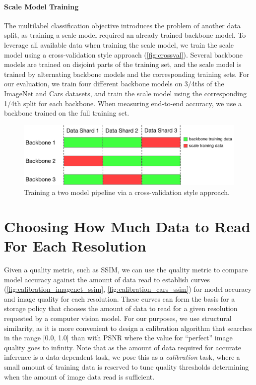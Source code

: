 \paragraph{Scale Model Training}
The multilabel classification objective introduces the problem of another data split, as training a scale model required an already trained backbone model.
To leverage all available data when training the scale model, we train the scale model using a cross-validation style approach (\autoref{fig:crossval}).
Several backbone models are trained on disjoint parts of the training set, and the scale model is trained by alternating backbone models and the corresponding training sets.
For our evaluation, we train four different backbone models on 3/4ths of the ImageNet and Cars datasets, and train the scale model using the corresponding 1/4th split for each backbone.
When measuring end-to-end accuracy, we use a backbone trained on the full training set.

\begin{figure}
    \centering
    \includegraphics[width=\textwidth]{e2e_diagrams/cross val.pdf}
    \caption{Training a two model pipeline via a cross-validation style approach.
    }
    \label{fig:crossval}
\end{figure}


\section{Choosing How Much Data to Read For Each Resolution}
Given a quality metric, such as SSIM, we can use the quality metric to compare model accuracy against the amount of data read to establish curves
(\autoref{fig:calibration_imagenet_ssim}, \autoref{fig:calibration_cars_ssim}) for model accuracy and image quality for each resolution.
These curves can form the basis for a storage policy that chooses the amount of data to read for a given resolution requested by a computer vision model.
For our purposes, we use structural similarity, as it is more convenient to design a calibration algorithm that searches in the range [0.0, 1.0] than with PSNR where the value for ``perfect'' image quality goes to infinity.
Note that as the amount of data required for accurate inference is a data-dependent task, we pose this as a \emph{calibration} task, where a small amount of training data is reserved to tune quality thresholds determining when the amount of image data read is sufficient.

